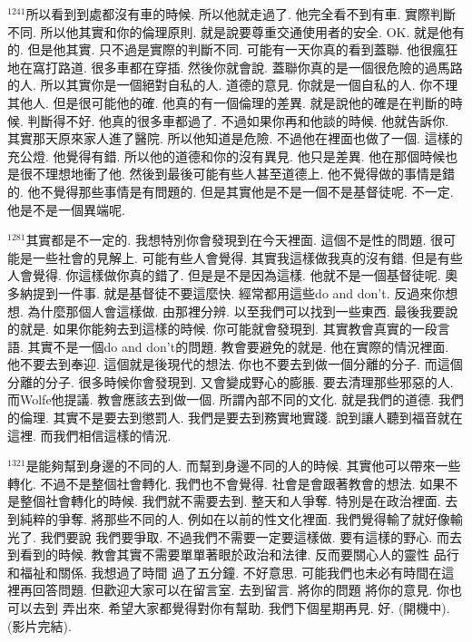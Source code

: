 \documentclass{book}
\begin{document}
$^{1241}$所以看到到處都沒有車的時候.
所以他就走過了.
他完全看不到有車.
實際判斷不同.
所以他其實和你的倫理原則.
就是說要尊重交通使用者的安全.
OK.
就是他有的.
但是他其實.
只不過是實際的判斷不同.
可能有一天你真的看到蓋聯.
他很瘋狂地在窩打路道.
很多車都在穿插.
然後你就會說.
蓋聯你真的是一個很危險的過馬路的人.
所以其實你是一個絕對自私的人.
道德的意見.
你就是一個自私的人.
你不理其他人.
但是很可能他的確.
他真的有一個倫理的差異.
就是說他的確是在判斷的時候.
判斷得不好.
他真的很多車都過了.
不過如果你再和他談的時候.
他就告訴你.
其實那天原來家人進了醫院.
所以他知道是危險.
不過他在裡面也做了一個.
這樣的充公燈.
他覺得有錯.
所以他的道德和你的沒有異見.
他只是差異.
他在那個時候也是很不理想地衝了他.
然後到最後可能有些人甚至道德上.
他不覺得做的事情是錯的.
他不覺得那些事情是有問題的.
但是其實他是不是一個不是基督徒呢.
不一定.
他是不是一個異端呢.

$^{1281}$其實都是不一定的.
我想特別你會發現到在今天裡面.
這個不是性的問題.
很可能是一些社會的見解上.
可能有些人會覺得.
其實我這樣做我真的沒有錯.
但是有些人會覺得.
你這樣做你真的錯了.
但是是不是因為這樣.
他就不是一個基督徒呢.
奧多納提到一件事.
就是基督徒不要這麼快.
經常都用這些do and don't.
反過來你想想.
為什麼那個人會這樣做.
由那裡分辨.
以至我們可以找到一些東西.
最後我要說的就是.
如果你能夠去到這樣的時候.
你可能就會發現到.
其實教會真實的一段言語.
其實不是一個do and don't的問題.
教會要避免的就是.
他在實際的情況裡面.
他不要去到奉迎.
這個就是後現代的想法.
你也不要去到做一個分離的分子.
而這個分離的分子.
很多時候你會發現到.
又會變成野心的膨脹.
要去清理那些邪惡的人.
而Wolfe他提議.
教會應該去到做一個.
所謂內部不同的文化.
就是我們的道德.
我們的倫理.
其實不是要去到懲罰人.
我們是要去到務實地實踐.
說到讓人聽到福音就在這裡.
而我們相信這樣的情況.

$^{1321}$是能夠幫到身邊的不同的人.
而幫到身邊不同的人的時候.
其實他可以帶來一些轉化.
不過不是整個社會轉化.
我們也不會覺得.
社會是會跟著教會的想法.
如果不是整個社會轉化的時候.
我們就不需要去到.
整天和人爭奪.
特別是在政治裡面.
去到純粹的爭奪.
將那些不同的人.
例如在以前的性文化裡面.
我們覺得輸了就好像輸光了.
我們要說 我們要爭取.
不過我們不需要一定要這樣做.
要有這樣的野心.
而去到看到的時候.
教會其實不需要單單著眼於政治和法律.
反而要關心人的靈性 品行和福祉和關係.
我想過了時間 過了五分鐘.
不好意思.
可能我們也未必有時間在這裡再回答問題.
但歡迎大家可以在留言室.
去到留言.
將你的問題 將你的意見.
你也可以去到 弄出來.
希望大家都覺得對你有幫助.
我們下個星期再見.
好.
(開機中).
(影片完結).
\newpage
\end{document}
